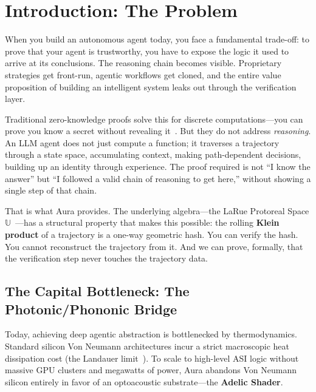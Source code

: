 \documentclass[12pt,a4paper]{article}
\begin{document}
\tableofcontents
\newpage

\section{Introduction: The Problem}
\label{sec:intro}

When you build an autonomous agent today, you face a fundamental trade-off: to prove that your agent is trustworthy, you have to expose the logic it used to arrive at its conclusions. The reasoning chain becomes visible. Proprietary strategies get front-run, agentic workflows get cloned, and the entire value proposition of building an intelligent system leaks out through the verification layer.

Traditional zero-knowledge proofs solve this for discrete computations---you can prove you know a secret without revealing it~\cite{goldwasser1989}. But they do not address \emph{reasoning}. An LLM agent does not just compute a function; it traverses a trajectory through a state space, accumulating context, making path-dependent decisions, building up an identity through experience. The proof required is not ``I know the answer'' but ``I followed a valid chain of reasoning to get here,'' without showing a single step of that chain.

That is what Aura provides. The underlying algebra---the LaRue Protoreal Space $\mathbb{U}$~\cite{PP-I-Ch1}---has a structural property that makes this possible: the rolling \textbf{Klein product} of a trajectory is a one-way geometric hash. You can verify the hash. You cannot reconstruct the trajectory from it. And we can prove, formally, that the verification step never touches the trajectory data.

\subsection{The Capital Bottleneck: The Photonic/Phononic Bridge}

Today, achieving deep agentic abstraction is bottlenecked by thermodynamics. Standard silicon Von Neumann architectures incur a strict macroscopic heat dissipation cost (the Landauer limit~\cite{landauer1961}). To scale to high-level ASI logic without massive GPU clusters and megawatts of power, Aura abandons Von Neumann silicon entirely in favor of an optoacoustic substrate---the \textbf{Adelic Shader}.
\end{document}
